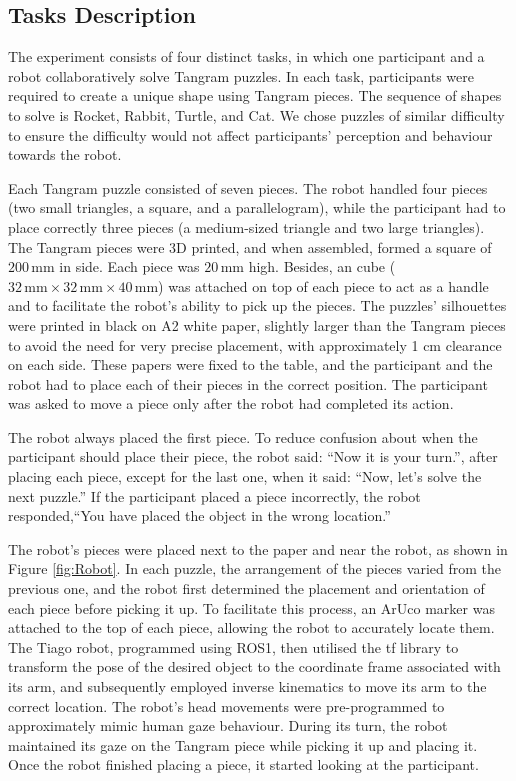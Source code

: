 
\subsection{Tasks Description}

The experiment consists of four distinct tasks, in which one participant and a robot collaboratively solve Tangram puzzles. In each task, participants were required to create a unique shape using Tangram pieces. The sequence of shapes to solve is Rocket, Rabbit, Turtle, and Cat. We chose puzzles of similar difficulty to ensure the difficulty would not affect participants’ perception and behaviour towards the robot.

Each Tangram puzzle consisted of seven pieces. The robot handled four pieces (two small triangles, a square, and a parallelogram), while the participant had to place correctly three pieces (a medium-sized triangle and two large triangles). The Tangram pieces were 3D printed, and when assembled, formed a square of $200\,\text{mm}$ in side. Each piece was $20\,\text{mm}$ high. Besides, an cube ($32\,\text{mm} \times 32\,\text{mm} \times 40\,\text{mm}$) was attached on top of each piece to act as a handle and to facilitate the robot's ability to pick up the pieces. The puzzles' silhouettes were printed in black on A2 white paper, slightly larger than the Tangram pieces to avoid the need for very precise placement, with approximately 1 cm clearance on each side. These papers were fixed to the table, and the participant and the robot had to place each of their pieces in the correct position. The participant was asked to move a piece only after the robot had completed its action.

The robot always placed the first piece. To reduce confusion about when the participant should place their piece, the robot said: ``Now it is your turn.'', after placing each piece, except for the last one, when it said: ``Now, let’s solve the next puzzle.'' If the participant placed a piece incorrectly, the robot responded,``You have placed the object in the wrong location.''

The robot's pieces were placed next to the paper and near the robot, as shown in Figure \ref{fig:Robot}. In each puzzle, the arrangement of the pieces varied from the previous one, and the robot first determined the placement and orientation of each piece before picking it up. To facilitate this process, an ArUco marker was attached to the top of each piece, allowing the robot to accurately locate them. The Tiago robot, programmed using ROS1, then utilised the tf library to transform the pose of the desired object to the coordinate frame associated with its arm, and subsequently employed inverse kinematics to move its arm to the correct location. The robot's head movements were pre-programmed to approximately mimic human gaze behaviour. During its turn, the robot maintained its gaze on the Tangram piece while picking it up and placing it. Once the robot finished placing a piece, it started looking at the participant.

